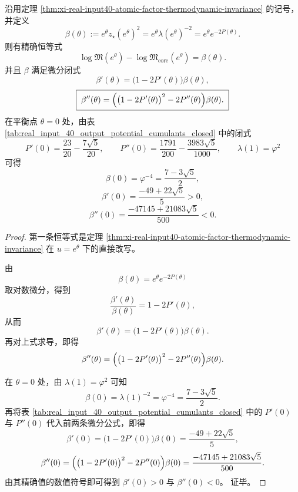 \begin{corollary}[原子有限部偏移的微分塔与平衡点初值]\label{cor:xi-real-input40-atomic-abel-shift-differential-tower}
沿用定理 \ref{thm:xi-real-input40-atomic-factor-thermodynamic-invariance} 的记号，并定义
\[
\beta(\theta):=e^\theta z_\star(e^\theta)^2
=
e^\theta\lambda(e^\theta)^{-2}
=
e^\theta e^{-2P(\theta)}.
\]
则有精确恒等式
\[
\boxed{\;
\log\mathfrak M(e^\theta)-\log\mathfrak M_{\mathrm{core}}(e^\theta)=\beta(\theta).\;}
\]
并且 \(\beta\) 满足微分闭式
\[
\boxed{\;
\beta'(\theta)=\bigl(1-2P'(\theta)\bigr)\beta(\theta),\;}
\]
\[
\boxed{\;
\beta''(\theta)=\Bigl(\bigl(1-2P'(\theta)\bigr)^2-2P''(\theta)\Bigr)\beta(\theta).\;}
\]
在平衡点 \(\theta=0\) 处，由表
\ref{tab:real_input_40_output_potential_cumulants_closed} 中的闭式
\[
P'(0)=\frac{23}{20}-\frac{7\sqrt5}{20},
\qquad
P''(0)=\frac{1791}{200}-\frac{3983\sqrt5}{1000},
\qquad
\lambda(1)=\varphi^2
\]
可得
\[
\boxed{\;
\beta(0)=\varphi^{-4}=\frac{7-3\sqrt5}{2},\;}
\]
\[
\boxed{\;
\beta'(0)=\frac{-49+22\sqrt5}{5}>0,\;}
\]
\[
\boxed{\;
\beta''(0)=\frac{-47145+21083\sqrt5}{500}<0.\;}
\]
\end{corollary}
\begin{proof}
第一条恒等式是定理
\ref{thm:xi-real-input40-atomic-factor-thermodynamic-invariance} 在 \(u=e^\theta\) 下的直接改写。

由
\[
\beta(\theta)=e^\theta e^{-2P(\theta)}
\]
取对数微分，得到
\[
\frac{\beta'(\theta)}{\beta(\theta)}=1-2P'(\theta),
\]
从而
\[
\beta'(\theta)=\bigl(1-2P'(\theta)\bigr)\beta(\theta).
\]
再对上式求导，即得
\[
\beta''(\theta)
=
\Bigl(\bigl(1-2P'(\theta)\bigr)^2-2P''(\theta)\Bigr)\beta(\theta).
\]

在 \(\theta=0\) 处，由 \(\lambda(1)=\varphi^2\) 可知
\[
\beta(0)=\lambda(1)^{-2}=\varphi^{-4}=\frac{7-3\sqrt5}{2}.
\]
再将表 \ref{tab:real_input_40_output_potential_cumulants_closed} 中的
\(P'(0)\) 与 \(P''(0)\) 代入前两条微分公式，即得
\[
\beta'(0)=\bigl(1-2P'(0)\bigr)\beta(0)=\frac{-49+22\sqrt5}{5},
\]
\[
\beta''(0)
=
\Bigl(\bigl(1-2P'(0)\bigr)^2-2P''(0)\Bigr)\beta(0)
=
\frac{-47145+21083\sqrt5}{500}.
\]
由其精确值的数值符号即可得到
\(
\beta'(0)>0
\)
与
\(
\beta''(0)<0
\)。
证毕。
\end{proof}

\endinput
